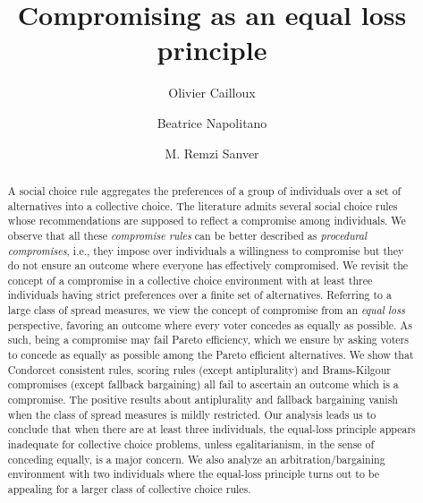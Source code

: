 \documentclass[version=3.21, pagesize, twoside=off, bibliography=totoc, DIV=calc, fontsize=12pt, a4paper]{scrartcl}
\title{Compromising as an equal loss principle}
\author{Olivier Cailloux}
\author{Beatrice Napolitano}
\author{M. Remzi Sanver}
\affil{Université Paris-Dauphine, Université PSL, CNRS, LAMSADE\\
	\href{mailto:@dauphine.fr}{name.lastname@dauphine.fr}
}
\begin{document}
\maketitle

\begin{abstract}
	A social choice rule aggregates the preferences of a group of individuals over a set of alternatives into a collective choice. The literature admits several social choice rules whose recommendations are supposed to reflect a compromise among individuals. We observe that all these \textit{compromise rules} can be better described as \emph{procedural compromises}, i.e., they impose over individuals a willingness to compromise but they do not ensure an outcome where everyone has effectively compromised. We revisit the concept of a compromise in a collective choice environment with at least three individuals having strict preferences over a finite set of alternatives. Referring to a large class of spread measures, we view the concept of compromise from an \emph{equal loss} perspective, favoring an outcome where every voter concedes as equally as possible. As such, being a compromise may fail Pareto efficiency, which we ensure by asking voters to concede as equally as possible among the Pareto efficient alternatives. We show that Condorcet consistent rules, scoring rules (except antiplurality) and Brams-Kilgour compromises (except fallback bargaining) all fail to ascertain an outcome which is a compromise. The positive results about antiplurality and fallback bargaining vanish when the class of spread measures is mildly restricted. 
	Our analysis leads us to conclude that when there are at least three individuals, the equal-loss principle appears inadequate for collective choice problems, unless egalitarianism, in the sense of conceding equally, is a major concern. 
	We also analyze an arbitration/bargaining environment with two individuals where the equal-loss principle turns out to be appealing for a larger class of collective choice rules.
\end{abstract}
\end{document}

